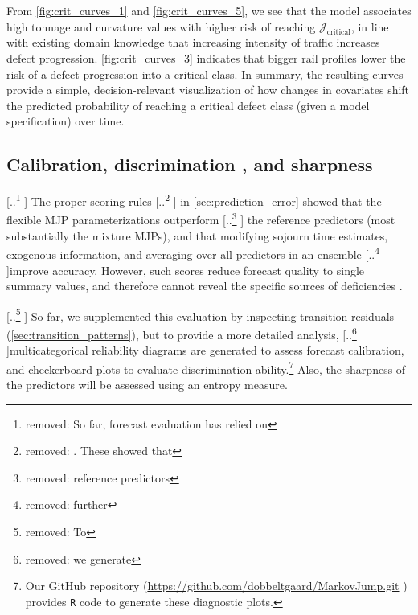 \documentclass{article}
\providecommand{\DIFadd}[1]{{\protect\color{blue} \sf #1}} %
\providecommand{\DIFdel}[1]{{\protect\color{red} [..\footnote{removed: #1} ]}} %
\providecommand{\DIFaddbegin}{} %
\providecommand{\DIFaddend}{} %
\providecommand{\DIFdelbegin}{} %
\providecommand{\DIFdelend}{} %
\begin{document}
\DIFadd{From \cref{fig:crit_curves_1} and \cref{fig:crit_curves_5}, we see that the model associates high tonnage and curvature values with higher risk of reaching $\mathcal J_{\text{critical}}$, in line with existing domain knowledge that increasing intensity of traffic increases defect progression. \cref{fig:crit_curves_3} indicates that bigger rail profiles lower the risk of a defect progression into a critical class.
In summary,  the resulting curves provide a simple, decision-relevant visualization of how changes in covariates shift the predicted probability of reaching a critical defect class (given a model specification) over time. 
}


\subsection{\DIFadd{Calibration, }\DIFaddend discrimination\DIFaddbegin \DIFadd{, and sharpness}\DIFaddend } \label{sec:reliability_analysis}
\DIFdelbegin \DIFdel{So far, forecast evaluation has relied on }\DIFdelend \DIFaddbegin \DIFadd{The }\DIFaddend proper scoring rules \DIFdelbegin \DIFdel{. These showed that }\DIFdelend \DIFaddbegin \DIFadd{in \cref{sec:prediction_error} showed that the }\DIFaddend flexible MJP parameterizations outperform \DIFdelbegin \DIFdel{reference predictors}\DIFdelend \DIFaddbegin \DIFadd{the reference predictors (most substantially the mixture MJPs)}\DIFaddend , and that modifying sojourn time estimates, exogenous information, and averaging over all predictors in an ensemble \DIFdelbegin \DIFdel{further }\DIFdelend improve accuracy.
However, such scores reduce forecast quality to single summary values, and therefore cannot reveal the specific sources of deficiencies \citep{hamill1997,Dimitriadis_2024}. \DIFdelbegin %

\DIFdel{To }\DIFdelend \DIFaddbegin \DIFadd{So far, we supplemented this evaluation by inspecting transition residuals (\cref{sec:transition_patterns}), but to }\DIFaddend provide a more detailed analysis, \DIFdelbegin \DIFdel{we generate }\DIFdelend multicategorical reliability diagrams \DIFaddbegin \DIFadd{are generated }\DIFaddend to assess forecast calibration, and checkerboard plots to evaluate discrimination ability.\DIFaddbegin \footnote{\DIFadd{Our GitHub repository (}\url{https://github.com/dobbeltgaard/MarkovJump.git}\DIFadd{) provides \texttt{R} code to generate these diagnostic plots.}} \DIFadd{Also, the sharpness of the predictors will be assessed using an entropy measure.
}
\end{document}
